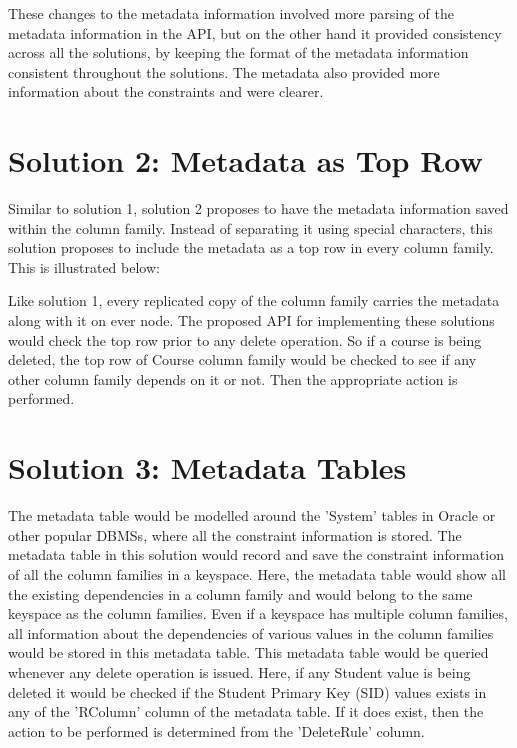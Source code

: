 These changes to the metadata information involved more parsing of the metadata
information in the API, but on the other hand it provided consistency across all
the solutions, by keeping the format of the metadata information consistent
throughout the solutions. The metadata also provided more information about the
constraints and were clearer.


\section{Solution 2:  Metadata as Top Row}\label{s:sol2}
Similar to solution 1, solution 2 proposes to have the metadata information
saved within the column family. Instead of separating it using special
characters, this solution proposes to include the metadata as a top row in every
column family. This is illustrated below:

Like solution 1, every replicated copy of the column family carries the metadata
along with it on ever node.
The proposed API for implementing these solutions would check the top row prior
to any delete operation. So if a course is being deleted, the top row of Course
column family would be checked to see if any other column family depends on it
or not. Then the appropriate action is performed.


\section{Solution 3:  Metadata Tables}\label{s:sol3}
The metadata table would be modelled around the 'System' tables in Oracle or
other popular DBMSs, where all the constraint information is stored. The
metadata table in this solution would record and save the constraint information
of all the column families in a keyspace. Here, the metadata table would show
all the existing dependencies in a column family and would belong to the same
keyspace as the column families.
Even if a keyspace has multiple column families, all information about the
dependencies of various values in the column families would be stored in this
metadata table.
This metadata table would be queried whenever any delete operation is issued.
Here, if any Student value is being deleted it would be checked if the Student
Primary Key (SID) values exists in any of the 'RColumn' column of the metadata
table. If it does exist, then the action to be performed is determined from the
'DeleteRule' column.

